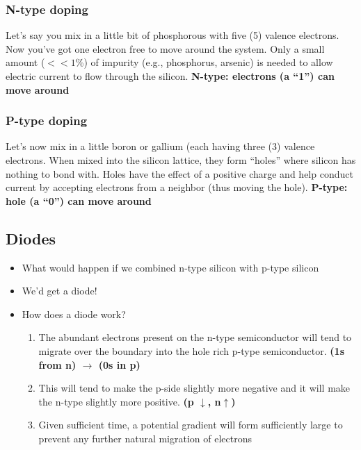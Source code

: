 \documentclass[11pt]{book}
\begin{document}
\subsubsection{N-type doping}
Let’s say you mix in a little bit of phosphorous with five (5) valence electrons. Now you’ve got one electron free to move around the system. Only a small amount ($<<1$\%) of impurity (e.g., phosphorus, arsenic) is needed to allow electric current to flow through the silicon. \textbf{N-type: electrons (a ``1'') can move around}

\subsubsection{P-type doping}
Let's now mix in a little boron or gallium (each having three (3) valence electrons. When mixed into the silicon lattice, they form ``holes'' where silicon has nothing to bond with. Holes have the effect of a positive charge and help conduct current by accepting electrons from a neighbor (thus moving the hole). \textbf{P-type: hole (a ``0'') can move around}



\subsection{Diodes}
\begin{itemize}
	\item What would happen if we combined n-type silicon with p-type silicon 
	\item We'd get a diode! 
	\item How does a diode work?
	\begin{enumerate}
		\item The abundant electrons present on the n-type semiconductor will tend to migrate over the boundary into the hole rich p-type semiconductor. 
		\subitem \textbf{(1s from n) $\rightarrow$ (0s in p)}
		\item This will tend to make the p-side slightly more negative and it will make the n-type slightly more positive. 
		\subitem \textbf{(p $\downarrow$, n$\uparrow$)}
		\item Given sufficient time, a potential gradient will form sufficiently large to prevent any further natural migration of electrons 
	\end{enumerate}
\end{itemize}
\end{document}
